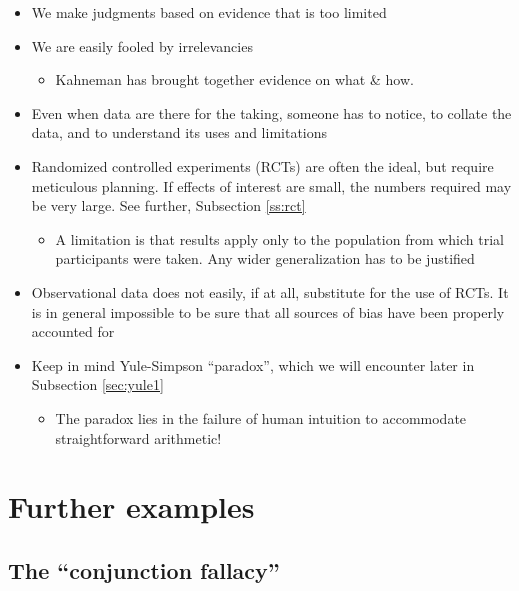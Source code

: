 \documentclass[
  10ptls,
  b5paper]{book}
\providecommand{\tightlist}{%
  \setlength{\itemsep}{0pt}\setlength{\parskip}{0pt}}
\begin{document}
\begin{itemize}
\tightlist
\item
  We make judgments based on evidence that is too limited
\item
  We are easily fooled by irrelevancies

  \begin{itemize}
  \tightlist
  \item
    Kahneman has brought together evidence on what \& how.
  \end{itemize}
\item
  Even when data are there for the taking, someone has to notice, to collate the data, and to understand its uses and limitations
\item
  Randomized controlled experiments (RCTs) are often the ideal, but require meticulous planning. If effects of interest are small, the numbers required may be very large. See further, Subsection \ref{ss:rct}

  \begin{itemize}
  \tightlist
  \item
    A limitation is that results apply only to the population from which
    trial participants were taken. Any wider generalization has to be justified
  \end{itemize}
\item
  Observational data does not easily, if at all, substitute for the use of
  RCTs. It is in general impossible to be sure that all sources of bias have
  been properly accounted for
\item
  Keep in mind Yule-Simpson ``paradox'', which we will encounter later in Subsection \ref{sec:yule1}

  \begin{itemize}
  \tightlist
  \item
    The paradox lies in the failure of human intuition to accommodate straightforward arithmetic!
  \end{itemize}
\end{itemize}

\hypertarget{further-examples}{%
\section{Further examples}\label{further-examples}}

\hypertarget{the-conjunction-fallacy}{%
\subsection*{The ``conjunction fallacy''}\label{the-conjunction-fallacy}}
\end{document}

